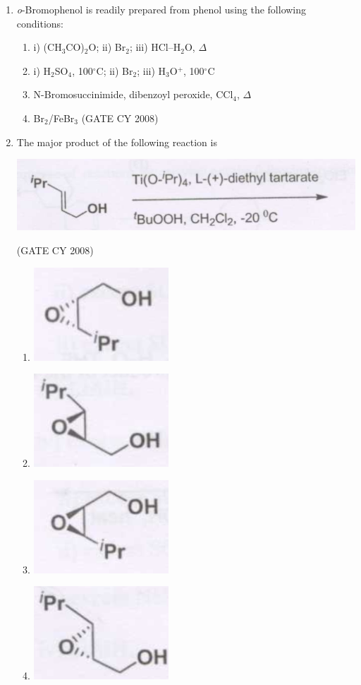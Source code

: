 \documentclass[12pt]{article}
\begin{document}
\begin{enumerate}
\item \textit{o}-Bromophenol is readily prepared from phenol using the following conditions:
\begin{enumerate}
\item i) (CH$_3$CO)$_2$O;  ii) Br$_2$;  iii) HCl–H$_2$O, $\Delta$
\item i) H$_2$SO$_4$, 100$^\circ$C;  ii) Br$_2$;  iii) H$_3$O$^+$, 100$^\circ$C
\item N-Bromosuccinimide, dibenzoyl peroxide, CCl$_4$, $\Delta$
\item Br$_2$/FeBr$_3$    \hfill{(GATE CY 2008)}
\end{enumerate}


\item The major product of the following reaction is

\begin{center}
\includegraphics[width=0.6\columnwidth]{figs/q42.png}
\end{center}    \hfill{(GATE CY 2008)}
\begin{enumerate}
    \item \includegraphics[width=0.2\columnwidth]{figs/q42 a.png} 
    \item \includegraphics[width=0.2\columnwidth]{figs/q42 b.png} 
    \item \includegraphics[width=0.2\columnwidth]{figs/q42 c.png} 
    \item \includegraphics[width=0.2\columnwidth]{figs/q42 d.png} 
\end{enumerate}


\end{enumerate}
\end{document}
